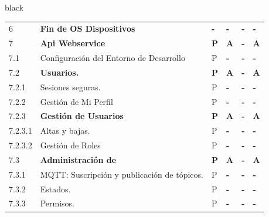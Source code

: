 \documentclass[11pt]{charter}
\begin{document}
\begin{consigna}{black}
\begin{tabularx}{\linewidth}{@{}|p{1.3cm}|p{10cm}|p{3cm}|p{3cm}|p{3cm}|p{3cm}|@{}}
6                      & \textbf{Fin de OS Dispositivos}                                                               & \textbf{-} & \textbf{-} & \textbf{-} & \textbf{-} \\
7                      & \textbf{Api Webservice}                                                                       & \textbf{P} & \textbf{A} & \textbf{-} & \textbf{A} \\
7.1                    & Configuración del Entorno de   Desarrollo                                                     & P          & \textbf{-} & \textbf{-} & \textbf{-} \\
7.2                    & \textbf{Usuarios.}                                                                            & \textbf{P} & \textbf{A} & \textbf{-} & \textbf{A} \\
7.2.1                  & Sesiones seguras.                                                                             & P          & \textbf{-} & \textbf{-} & \textbf{-} \\
7.2.2                  & Gestión de Mi Perfil                                                                          & P          & \textbf{-} & \textbf{-} & \textbf{-} \\
7.2.3                  & \textbf{Gestión de Usuarios}                                                                  & \textbf{P} & \textbf{A} & \textbf{-} & \textbf{A} \\
7.2.3.1                & Altas y bajas.                                                                                & P          & \textbf{-} & \textbf{-} & \textbf{-} \\
7.2.3.2                & Gestión de Roles                                                                              & P          & \textbf{-} & \textbf{-} & \textbf{-} \\
7.3                    & \textbf{Administración de}                                                                    & \textbf{P} & \textbf{A} & \textbf{-} & \textbf{A} \\
7.3.1                  & MQTT: Suscripción y publicación   de tópicos.                                                 & P          & \textbf{-} & \textbf{-} & \textbf{-} \\
7.3.2                  & Estados.                                                                                      & P          & \textbf{-} & \textbf{-} & \textbf{-} \\
7.3.3                  & Permisos.                                                                                     & P          & \textbf{-} & \textbf{-} & \textbf{-} \\

\end{tabularx}
\end{consigna}
\end{document}

